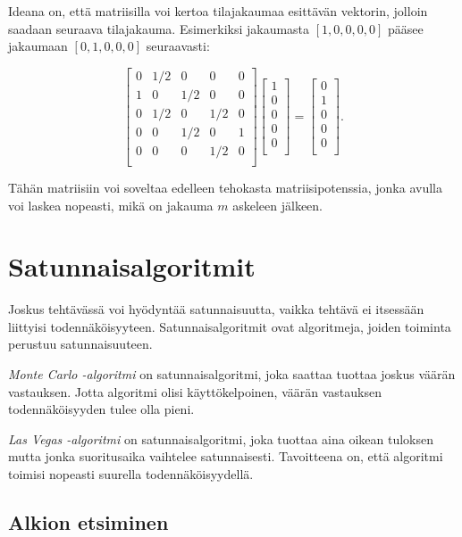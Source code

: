 Ideana on, että matriisilla voi kertoa tilajakaumaa esittävän
vektorin, jolloin saadaan seuraava tilajakauma.
Esimerkiksi jakaumasta $[1,0,0,0,0]$ pääsee jakaumaan
$[0,1,0,0,0]$ seuraavasti:

\[ 
 \begin{bmatrix}
  0 & 1/2 & 0 & 0 & 0 \\
  1 & 0 & 1/2 & 0 & 0 \\
  0 & 1/2 & 0 & 1/2 & 0 \\
  0 & 0 & 1/2 & 0 & 1 \\
  0 & 0 & 0 & 1/2 & 0 \\
 \end{bmatrix}
 \begin{bmatrix}
  1 \\
  0 \\
  0 \\
  0 \\
  0 \\
 \end{bmatrix}
=
 \begin{bmatrix}
  0 \\
  1 \\
  0 \\
  0 \\
  0 \\
 \end{bmatrix}.
\]

Tähän matriisiin voi soveltaa edelleen tehokasta
matriisipotenssia, jonka avulla voi laskea nopeasti,
mikä on jakauma $m$ askeleen jälkeen.

\section{Satunnaisalgoritmit}

Joskus tehtävässä voi hyödyntää satunnaisuutta,
vaikka tehtävä ei itsessään liittyisi todennäköisyyteen.
Satunnaisalgoritmit ovat algoritmeja, joiden toiminta
perustuu satunnaisuuteen.

\textit{Monte Carlo -algoritmi} on satunnaisalgoritmi,
joka saattaa tuottaa joskus väärän vastauksen.
Jotta algoritmi olisi käyttökelpoinen,
väärän vastauksen todennäköisyyden tulee olla pieni.

\textit{Las Vegas -algoritmi} on satunnaisalgoritmi,
joka tuottaa aina oikean tuloksen mutta jonka
suoritusaika vaihtelee satunnaisesti.
Tavoitteena on, että algoritmi toimisi nopeasti
suurella todennäköisyydellä.

\subsection{Alkion etsiminen}

